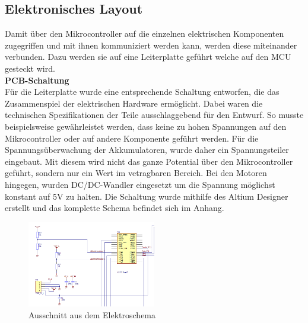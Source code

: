 \subsection{Elektronisches Layout}
Damit über den Mikrocontroller auf die einzelnen elektrischen Komponenten zugegriffen und mit ihnen kommuniziert werden kann, werden diese miteinander verbunden. Dazu werden sie auf eine Leiterplatte geführt welche auf den MCU gesteckt wird.
\\[0.2cm]

\textbf{PCB-Schaltung}\\[0.2cm]
Für die Leiterplatte wurde eine entsprechende Schaltung entworfen, die das Zusammenspiel der elektrischen Hardware ermöglicht. Dabei waren die technischen Spezifikationen der Teile ausschlaggebend für den Entwurf.
So musste beispielsweise gewährleistet werden, dass  keine zu hohen Spannungen auf den Mikrocontroller oder auf andere Komponente geführt werden. Für die Spannungsüberwachung der Akkumulatoren, wurde daher ein Spannungsteiler eingebaut. Mit diesem wird nicht das ganze Potential über den Mikrocontroller geführt, sondern nur ein Wert im vetragbaren Bereich. Bei den Motoren hingegen, wurden DC/DC-Wandler eingesetzt um die Spannung möglichst konstant auf 5V zu halten.
Die Schaltung wurde mithilfe des Altium Designer erstellt und das komplette Schema befindet sich im Anhang.
\\[0.2cm]
\begin{figure}[H]
\centering
\includegraphics[width=0.5\textwidth]{03_Loesungskonzept/pictures/pcbspannungsteiler.png}
\caption{Ausschnitt aus dem Elektroschema}	
\end{figure}

